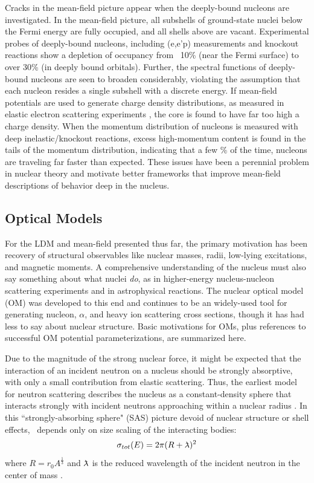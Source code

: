 Cracks in the mean-field picture appear when the deeply-bound
nucleons are investigated. In the mean-field picture, all subshells of
ground-state nuclei below the Fermi energy are fully occupied, and all shells
above are vacant. Experimental probes of deeply-bound nucleons, including
(e,e'p) measurements \cite{eep1, eep2} and knockout reactions \cite{knockout1,
knockout2} show a depletion of occupancy from ~10\% (near the Fermi surface) to
over 30\% (in deeply bound orbitals). Further, the spectral functions of deeply-bound
nucleons are seen to broaden considerably, violating the assumption that each
nucleon resides a single subshell with a discrete energy. If mean-field
potentials are used to generate charge density distributions, as measured in
elastic electron scattering experiments \cite{DeVries}, the core is found to
have far too high a charge density. When the momentum distribution of nucleons
is measured with deep
inelastic/knockout reactions, excess high-momentum content is found in the tails
of the momentum distribution, indicating that a few \% of the time, nucleons are
traveling far faster than expected. These issues have been a perennial problem
in nuclear theory and motivate better frameworks that improve mean-field
descriptions of behavior deep in the nucleus.

\subsection{Optical Models}
For the LDM and mean-field presented thus far, the primary motivation has been recovery
of structural observables like nuclear masses, radii, low-lying excitations, and magnetic moments. 
A comprehensive understanding of the nucleus must also say something about what
nuclei \textit{do}, as in higher-energy nucleus-nucleon scattering experiments
and in astrophysical reactions.
The nuclear optical model (OM) was developed to this end and continues to be an
widely-used tool for generating nucleon, $\alpha$, and heavy ion scattering
cross sections, though it has had less to say about nuclear structure. Basic
motivations for OMs, plus references to successful OM potential parameterizations,
are summarized here.

Due to the magnitude of the strong nuclear force, it might be expected that 
the interaction of an incident neutron on a nucleus should be strongly
absorptive, with only a small contribution from elastic scattering. Thus, the
earliest model for neutron scattering describes the nucleus as a constant-density
sphere that interacts strongly with incident neutrons approaching within a nuclear radius
\cite{Feshbach1949}. In this ``strongly-absorbing sphere" (SAS) picture devoid of nuclear structure
or shell effects, \tot\ depends only on size scaling of the interacting bodies:
\begin{equation} \label{SASAbsolute}
    \sigma_{tot}(E) = 2\pi(R + \lambdabar)^{2}
\end{equation}
where $R=r_{0}A^{\frac{1}{3}}$ and $\lambdabar$ is the reduced wavelength
of the incident neutron in the center of mass \cite{Fernbach1949, Satchler1980}. 

